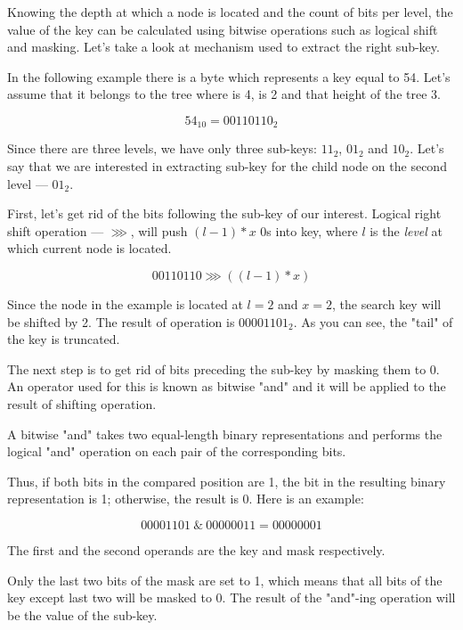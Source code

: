 Knowing the depth at which a node is located and the count of bits per level, the value of the key can be calculated using bitwise operations such as logical shift and masking. Let's take a look at mechanism used to extract the right sub-key. 

In the following example there is a byte which represents a key equal to 54. Let's assume that it belongs to the tree where \m is 4, \x is 2 and that height of the tree 3. 

\begin{equation}
    54_{10} = 00110110_2    
\end{equation}

Since there are three levels, we have only three sub-keys: $11_2$, $01_2$ and $10_2$. Let's say that we are interested in extracting sub-key for the child node on the second level --- $01_2$. 

First, let's get rid of the bits following the sub-key of our interest. Logical right shift operation --- $\ggg$, will push $(l - 1) * x$ 0s into key, where $l$ is the \emph{level} at which current node is located. 

\begin{equation}
    00110110 \ggg ((l - 1) * x)
\end{equation}

Since the node in the example is located at $l = 2$ and $x = 2$, the search key will be shifted by 2. The result of operation is $00001101_2$. As you can see, the "tail" of the key is truncated.

The next step is to get rid of bits preceding the sub-key by masking them to 0. An operator used for this is known as bitwise "and" and it will be applied to the result of shifting operation. 

A bitwise "and" takes two equal-length binary representations and performs the logical "and" operation on each pair of the corresponding bits. 

Thus, if both bits in the compared position are 1, the bit in the resulting binary representation is 1; otherwise, the result is 0. Here is an example:

\begin{equation}
    00001101 \ \& \ 00000011 = 00000001
\end{equation}
                                    
The first and the second operands are the key and mask respectively. 

Only the last two bits of the mask are set to 1, which means that all bits of the key except last two will be masked to 0. The result of the "and"-ing operation will be the value of the sub-key.

